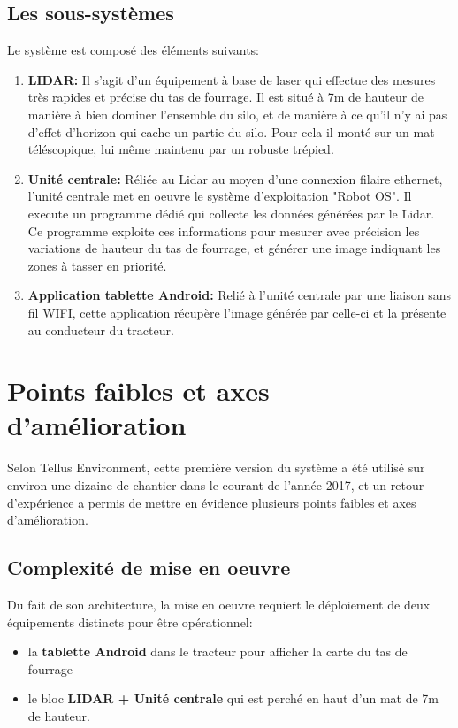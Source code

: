 \documentclass[12pt,a4paper]{report}
\begin{document}
\subsection{Les sous-systèmes}
Le système est composé des éléments suivants:

\begin{enumerate}
	\item \textbf{LIDAR:} Il s'agit d'un équipement à base de laser qui effectue des mesures très rapides et précise du tas de fourrage. Il est situé à 7m de hauteur de manière à bien dominer l'ensemble du silo, et de manière à ce qu'il n'y ai pas d'effet d'horizon qui cache un partie du silo. Pour cela il monté sur un mat téléscopique, lui même maintenu par un robuste trépied.
	
	\item \textbf{Unité centrale:} Réliée au Lidar au moyen d'une connexion filaire ethernet, l'unité centrale met en oeuvre le système d'exploitation "Robot OS". Il execute un programme dédié qui collecte les données générées par le Lidar. Ce programme exploite ces informations pour mesurer avec précision les variations de hauteur du tas de fourrage, et générer une image indiquant les zones à tasser en priorité.
	
	\item \textbf{Application tablette Android:} Relié à l'unité centrale par une liaison sans fil WIFI, cette application récupère l'image générée par celle-ci et la présente au conducteur du tracteur.
\end{enumerate}

\section{Points faibles et axes d'amélioration}
Selon Tellus Environment, cette première version du système a été utilisé sur environ une dizaine de chantier dans le courant de l'année 2017, et un retour d'expérience a permis de mettre en évidence plusieurs points faibles et axes d'amélioration.

\subsection{Complexité de mise en oeuvre}

Du fait de son architecture, la mise en oeuvre requiert le déploiement de deux équipements distincts pour être opérationnel:

\begin{itemize}
	\item la \textbf{tablette Android} dans le tracteur pour afficher la carte du tas de fourrage
	\item le bloc \textbf{LIDAR + Unité centrale} qui est perché en haut d'un mat de 7m de hauteur.
\end{itemize}
\end{document}
